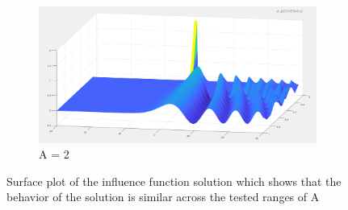 \documentclass{article}
\begin{document}
\begin{figure}[H]
\begin{subfigure}[b]{85mm}
\includegraphics[scale=0.14]{figures/infl2V.png}
\caption{A = 2}
\label{fig:}
\end{subfigure}

\caption{Surface plot of the influence function solution which shows that the behavior of the solution is similar across the tested ranges of A}
\label{fig:}
\end{figure}
\end{document}
